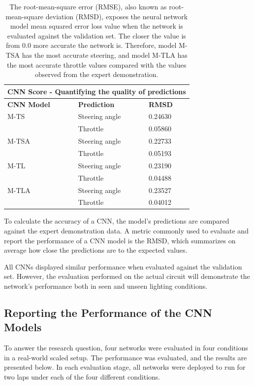 \documentclass[12pt]{article}
\begin{document}
\begin{table}[H]
\begin{center}
\begin{tabular}{  |p{3cm}|p{3cm}|p{3cm}| } 

\hline
\multicolumn{3}{|c|}{\textbf{CNN Score - Quantifying the quality of predictions}} \\
\hline
\textbf{CNN Model} & \textbf{Prediction} & \textbf{RMSD} \\
\hline
M-TS & Steering angle & 0.24630 \\ 
& Throttle & 0.05860 \\ 
\hline
M-TSA & Steering angle & 0.22733 \\ 
& Throttle & 0.05193 \\ 
\hline
M-TL & Steering angle & 0.23190 \\ 
& Throttle & 0.04488 \\ 
\hline
M-TLA & Steering angle & 0.23527 \\ 
& Throttle & 0.04012 \\ 
\hline
\end{tabular}
\caption{\label{tab:mse}The root-mean-square error (RMSE), also known as root-mean-square deviation (RMSD), exposes the neural network model mean squared error loss value when the network is evaluated against the validation set. The closer the value is from 0.0 more accurate the network is. Therefore, model M-TSA has the most accurate steering, and model M-TLA has the most accurate throttle values compared with the values observed from the expert demonstration.
}
\end{center}
\end{table}

To calculate the accuracy of a CNN, the model's predictions are compared against the expert demonstration data. A metric commonly used to evaluate and report the performance of a CNN model is the RMSD, which summarizes on average how close the predictions are to the expected values. 

All CNNs displayed similar performance when evaluated against the validation set. However, the evaluation performed on the actual circuit will demonstrate the network's performance both in seen and unseen lighting conditions. 

\subsection{Reporting the Performance of the CNN Models}

To answer the research question, four networks were evaluated in four conditions in a real-world scaled setup. The performance was evaluated, and the results are presented below. In each evaluation stage, all networks were deployed to run for two laps under each of the four different conditions. 
\end{document}

